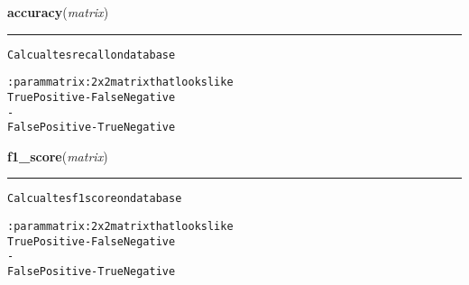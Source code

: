     \vspace{0.5ex}

\hspace{.8\funcindent}\begin{boxedminipage}{\funcwidth}

    \raggedright \textbf{accuracy}(\textit{matrix})

    \vspace{-1.5ex}

    \rule{\textwidth}{0.5\fboxrule}
\setlength{\parskip}{2ex}
\begin{alltt}
Calcualtes recall on database

:param matrix: 2x2 matrix that looks like
True Positive  - False Negative
     {\textbar}         -       {\textbar}
False Positive - True Negative
\end{alltt}

\setlength{\parskip}{1ex}
    \end{boxedminipage}

    \label{hal:ml:utils:misc:f1_score}

    \vspace{0.5ex}

\hspace{.8\funcindent}\begin{boxedminipage}{\funcwidth}

    \raggedright \textbf{f1\_score}(\textit{matrix})

    \vspace{-1.5ex}

    \rule{\textwidth}{0.5\fboxrule}
\setlength{\parskip}{2ex}
\begin{alltt}
Calcualtes f1 score on database

:param matrix: 2x2 matrix that looks like
True Positive  - False Negative
     {\textbar}         -       {\textbar}
False Positive - True Negative
\end{alltt}

\setlength{\parskip}{1ex}
    \end{boxedminipage}

    \label{hal:ml:utils:misc:pearson}

    \vspace{0.5ex}

